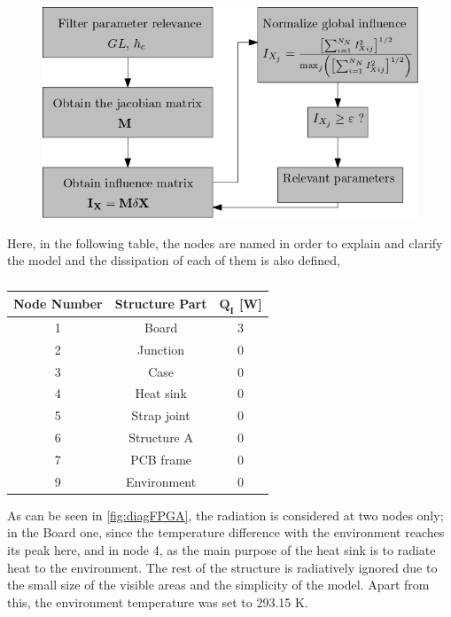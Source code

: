 \begin{figure}[H]
    \centering
    \includegraphics[width = \textwidth]{Figures/influence_diagram.png}
    \caption{}
    \label{fig:1}
\end{figure}

Here, in the following table, the nodes are named in order to explain and clarify the model and the dissipation of each of them is also defined,

\begin{table}[H]
    \centering
    \caption{}
    \label{tab:nodesFPGA}
    \begin{tabular}{c c c}
    \toprule
    \multicolumn{1}{c}{\textbf{Node Number}} & \multicolumn{1}{c}{\textbf{Structure Part}} & \multicolumn{1}{c}{$\boldsymbol{Q_I}$ [W]} \\\midrule
    1 & Board  & 3 \\
    2 & Junction  & 0 \\
    3 & Case  & 0 \\
    4 & Heat sink  & 0 \\
    5 & Strap joint  & 0 \\
    6 & Structure A  & 0 \\
    7 & PCB frame  & 0 \\
    9 & Environment  & 0 \\\bottomrule
    \end{tabular}
    \end{table}

As can be seen in \autoref{fig:diagFPGA}, the radiation is considered at two nodes only; in the Board one, since the temperature difference with the environment reaches its peak here, and in node 4, as the main purpose of the heat sink is to radiate heat to the environment. The rest of the structure is radiatively ignored due to the small size of the visible areas and the simplicity of the model. Apart from this, the environment temperature was set to 293.15 K.

